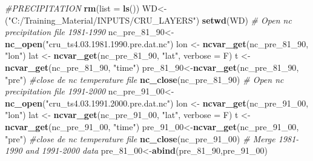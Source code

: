 \documentclass[
  10pt,
  b5paper,
]{book}
\newenvironment{Shaded}{\begin{snugshade}}{\end{snugshade}}
\newcommand{\CommentTok}[1]{\textcolor[rgb]{0.56,0.35,0.01}{\textit{#1}}}
\newcommand{\DataTypeTok}[1]{\textcolor[rgb]{0.13,0.29,0.53}{#1}}
\newcommand{\DecValTok}[1]{\textcolor[rgb]{0.00,0.00,0.81}{#1}}
\newcommand{\KeywordTok}[1]{\textcolor[rgb]{0.13,0.29,0.53}{\textbf{#1}}}
\newcommand{\NormalTok}[1]{#1}
\newcommand{\StringTok}[1]{\textcolor[rgb]{0.31,0.60,0.02}{#1}}
\begin{document}
\begin{Shaded}
\begin{Highlighting}[]
 \CommentTok{#PRECIPITATION}
 \KeywordTok{rm}\NormalTok{(}\DataTypeTok{list =} \KeywordTok{ls}\NormalTok{())}
\NormalTok{WD<-(}\StringTok{"C:/Training_Material/INPUTS/CRU_LAYERS"}\NormalTok{)}
\KeywordTok{setwd}\NormalTok{(WD)}
 \CommentTok{# Open nc precipitation file 1981-1990}
\NormalTok{nc_pre_}\DecValTok{81}\NormalTok{_}\DecValTok{90}\NormalTok{<-}\KeywordTok{nc_open}\NormalTok{(}\StringTok{"cru_ts4.03.1981.1990.pre.dat.nc"}\NormalTok{)}
\NormalTok{ lon <-}\StringTok{ }\KeywordTok{ncvar_get}\NormalTok{(nc_pre_}\DecValTok{81}\NormalTok{_}\DecValTok{90}\NormalTok{, }\StringTok{"lon"}\NormalTok{)}
\NormalTok{lat <-}\StringTok{ }\KeywordTok{ncvar_get}\NormalTok{(nc_pre_}\DecValTok{81}\NormalTok{_}\DecValTok{90}\NormalTok{, }\StringTok{"lat"}\NormalTok{, }\DataTypeTok{verbose =}\NormalTok{ F)}
\NormalTok{t <-}\StringTok{ }\KeywordTok{ncvar_get}\NormalTok{(nc_pre_}\DecValTok{81}\NormalTok{_}\DecValTok{90}\NormalTok{, }\StringTok{"time"}\NormalTok{)}
\NormalTok{ pre_}\DecValTok{81}\NormalTok{_}\DecValTok{90}\NormalTok{<-}\KeywordTok{ncvar_get}\NormalTok{(nc_pre_}\DecValTok{81}\NormalTok{_}\DecValTok{90}\NormalTok{, }\StringTok{"pre"}\NormalTok{)}
 \CommentTok{#close de nc temperature file}
 \KeywordTok{nc_close}\NormalTok{(nc_pre_}\DecValTok{81}\NormalTok{_}\DecValTok{90}\NormalTok{) }
 \CommentTok{# Open nc precipitation file 1991-2000}
\NormalTok{nc_pre_}\DecValTok{91}\NormalTok{_}\DecValTok{00}\NormalTok{<-}\KeywordTok{nc_open}\NormalTok{(}\StringTok{"cru_ts4.03.1991.2000.pre.dat.nc"}\NormalTok{)}
\NormalTok{ lon <-}\StringTok{ }\KeywordTok{ncvar_get}\NormalTok{(nc_pre_}\DecValTok{91}\NormalTok{_}\DecValTok{00}\NormalTok{, }\StringTok{"lon"}\NormalTok{)}
\NormalTok{lat <-}\StringTok{ }\KeywordTok{ncvar_get}\NormalTok{(nc_pre_}\DecValTok{91}\NormalTok{_}\DecValTok{00}\NormalTok{, }\StringTok{"lat"}\NormalTok{, }\DataTypeTok{verbose =}\NormalTok{ F)}
\NormalTok{t <-}\StringTok{ }\KeywordTok{ncvar_get}\NormalTok{(nc_pre_}\DecValTok{91}\NormalTok{_}\DecValTok{00}\NormalTok{, }\StringTok{"time"}\NormalTok{)}
\NormalTok{pre_}\DecValTok{91}\NormalTok{_}\DecValTok{00}\NormalTok{<-}\KeywordTok{ncvar_get}\NormalTok{(nc_pre_}\DecValTok{91}\NormalTok{_}\DecValTok{00}\NormalTok{, }\StringTok{"pre"}\NormalTok{)}
 \CommentTok{#close de nc temperature file}
 \KeywordTok{nc_close}\NormalTok{(nc_pre_}\DecValTok{91}\NormalTok{_}\DecValTok{00}\NormalTok{) }
 \CommentTok{# Merge 1981-1990 and 1991-2000 data }
\NormalTok{ pre_}\DecValTok{81}\NormalTok{_}\DecValTok{00}\NormalTok{<-}\KeywordTok{abind}\NormalTok{(pre_}\DecValTok{81}\NormalTok{_}\DecValTok{90}\NormalTok{,pre_}\DecValTok{91}\NormalTok{_}\DecValTok{00}\NormalTok{) }

\end{Highlighting}
\end{Shaded}
\end{document}
